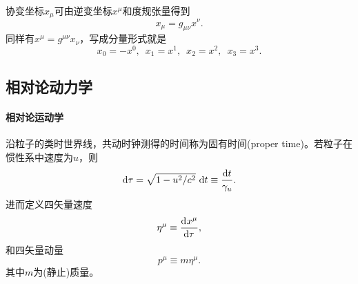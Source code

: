 \begin{corollary}
    协变坐标$x_\mu$可由逆变坐标$x^\mu$和度规张量得到
    \begin{equation}
        x_\mu = g_{\mu\nu}x^\nu.
    \end{equation}
    同样有$x^\mu = g^{\mu\nu}x_\nu$，写成分量形式就是
    \[
        x_0 = -x^0,\enspace x_1 = x^1,\enspace x_2 = x^2,\enspace x_3 = x^3.
    \]
\end{corollary}

\subsection{相对论动力学}

\paragraph{相对论运动学}

沿粒子的类时世界线，共动时钟测得的时间称为固有时间(proper time)。若粒子在惯性系中速度为$u$，则
\begin{equation}
    \label{eq:ed-proper-time}
    \mathop{}\!\mathrm{d}\tau = \sqrt{1 - u^2/c^2}\,\mathop{}\!\mathrm{d} t \equiv \frac{\mathop{}\!\mathrm{d} t}{\gamma_u}.
\end{equation}
进而定义四矢量速度
\begin{equation}
    \eta^\mu \equiv \frac{\mathop{}\!\mathrm{d}^{}x^\mu}{\mathrm{d}{\tau}^{}},
\end{equation}
和四矢量动量
\begin{equation}
    p^\mu \equiv m\eta^\mu.
\end{equation}
其中$m$为(静止)质量。

